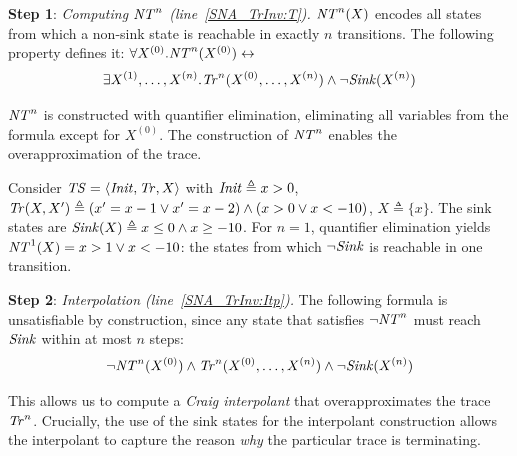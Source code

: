 \textbf{Step 1}: \textit{Computing $\mathit{NT}^n$ (line~\ref{SNA_TrInv:T}).} 
$\mathit{NT}^n(X)$ encodes all states from which a non-sink state is reachable in exactly $n$ transitions. 
The following property defines it: $\forall X^{(0)}. \mathit{NT}^n(X^{(0)}) \leftrightarrow $
$$\exists X^{(1)}, \ldots, X^{(n)}. \mathit{Tr}^{n}(X^{(0)}, \ldots, X^{(n)}) \land \lnot \mathit{Sink}(X^{(n)})$$

$\mathit{NT}^n$ is constructed with quantifier elimination, eliminating all variables from the formula except for $X^{(0)}$.
The construction of $\mathit{NT}^n$ enables the overapproximation of the trace.

\begin{example}\label{Ex:Tn}
    Consider $\mathit{TS} = \langle \mathit{Init}, \mathit{Tr}, X \rangle$ with $\mathit{Init} \triangleq  x > 0$, 
    $\mathit{Tr}(X,X') \triangleq  (x' = x - 1 \lor x' = x - 2) \land (x > 0 \lor x < -10)$, $X \triangleq  \{x\}$.
    The sink states are $\mathit{Sink}(X) \triangleq x \leq 0 \land x \geq -10$.
    For $n = 1$, quantifier elimination yields $\mathit{NT}^1(X) = x > 1 \lor x < -10$: 
    the states from which $\lnot \mathit{Sink}$ is reachable in one transition.
\end{example}

\textbf{Step 2}: \textit{Interpolation (line~\ref{SNA_TrInv:Itp}).}
The following formula is unsatisfiable by construction, since any state that satisfies
$\lnot \mathit{NT}^n$ must reach $\mathit{Sink}$ within at most $n$ steps:
$$\lnot \mathit{NT}^{n}(X^{(0)}) \land \mathit{Tr}^{n}(X^{(0)}, \ldots, X^{(n)}) \land \lnot \mathit{Sink}(X^{(n)})$$

This allows us to compute a \emph{Craig interpolant} that overapproximates the trace $\mathit{Tr}^{n}$.
Crucially, the use of the sink states for the interpolant construction allows the interpolant to capture the reason \emph{why} 
the particular trace is terminating.



